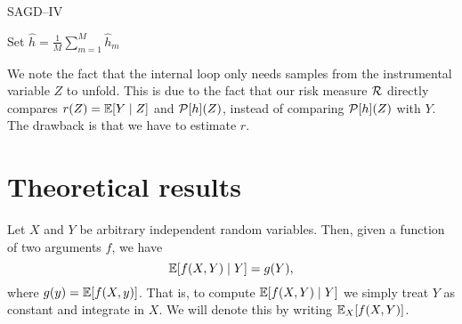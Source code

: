 \begin{algorithm}[H]\label{algo: sagdiv}
    \caption{SAGD--IV}
Set $ \hat{ h } = \frac{ 1 }{ M } \sum_{ m=1 }^{ M } \hat{ h }_{ m } $ \;
\end{algorithm}
We note the fact that the internal loop only needs samples from the instrumental variable $ Z $ to unfold.
This is due to the fact that our risk measure $ \mathcal{R} $ directly compares $ r ( Z ) = \mathbb{E} [ Y \mid Z ] $ and $ \mathcal{P} [ h ] ( Z ) $, instead of comparing $ \mathcal{P} [ h ] ( Z ) $ with $ Y $.
The drawback is that we have to estimate $ r $.

\section{Theoretical results}

\begin{rem}
    Let $ X $ and $ Y $ be arbitrary independent random variables.
    Then, given a function of two arguments $ f $, we have
    \begin{equation*}
        \mathbb{E} [ f ( X, Y ) \mid Y ] = g ( Y )
    ,\end{equation*}
    where $ g ( y ) = \mathbb{E} [ f ( X, y ) ] $.
    That is, to compute $ \mathbb{E} [ f ( X, Y ) \mid Y ] $ we simply treat $ Y $ as constant and integrate in $ X $.
    We will denote this by writing $ \mathbb{E}_{ X } [ f ( X, Y ) ] $.
\end{rem}

